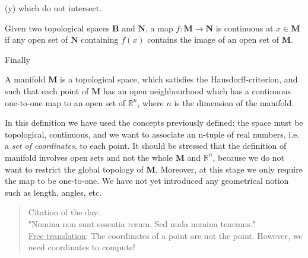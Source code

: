 \documentclass[../main.tex]{subfiles}
\begin{document}
(y)\) which do not intersect.
\begin{definition}
Given two topological spaces $\mathbf{B}$ and $\mathbf{N}$, a map $f : \mathbf{M} \to \mathbf{N}$ is continuous at $x \in \mathbf{M}$ if any
open set of $\mathbf{N}$ containing $f(x)$ contains the image of an open set of $\mathbf{M}$.
\end{definition}
Finally
\begin{definition}[Manifold]
A manifold $\mathbf{M}$ is a topological space, which satisfies the Hausdorff-criterion, and such that each point of $\mathbf{M}$ has an open neighbourhood which has a continuous one-to-one map to an open set of $\mathbb{R}^n$, where $n$ is the dimension of the manifold.
\end{definition}
In this definition we have used the concepts previously defined: the space must be topological, continuous, and we want to associate an n-tuple of real numbers, i.e. a \textit{set of coordinates}, to each point. It should be stressed that the
definition of manifold involves open sets and not the whole $\mathbf{M}$ and $\mathbb{R}^n$, because we do not want to restrict the global topology of $\mathbf{M}$. Moreover, at this stage we only require the map to be one-to-one. We have not yet introduced any geometrical notion such as length, angles, etc.
\newpage
\vspace*{\fill} 
\begin{quote} 
{\centering 
Citation of the day:\\
"Nomina non sunt essentia rerum. Sed nuda nomina tenemus."}\\
\newline
\underline{Free translation}: The coordinates of a point are not the point. However, we need coordinates to compute!
\end{quote}
\vspace*{\fill}
\end{document}

